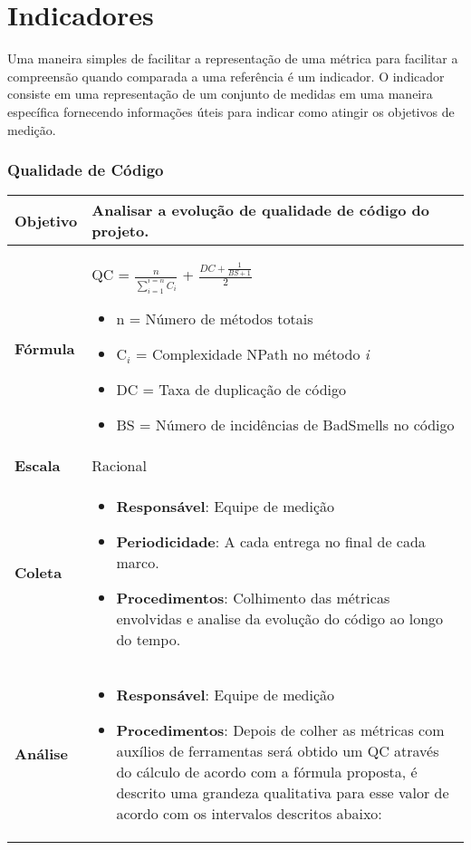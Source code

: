 \chapter{Indicadores}

Uma maneira simples de facilitar a representação de uma métrica para facilitar a compreensão quando comparada a uma referência é um indicador. O indicador consiste em uma representação de um conjunto de medidas em uma maneira específica fornecendo informações úteis para indicar como atingir os objetivos de medição.

\subsection{Qualidade de Código}

	\begin{tabular}{ |p{3cm}|p{12cm}| }
	 \hline
    \textbf{Objetivo} & Analisar a evolução de qualidade de código do projeto. \\
   \hline
    \textbf{Fórmula} & QC = $\frac{n}{\sum_{i=1}^{i=n} C_i}$ + $\frac{DC + \frac{1}{BS + 1}}{2}$ \begin{itemize}
			\item n = Número de métodos totais
			\item C$_i$ = Complexidade NPath no método \textit{i}
			\item DC = Taxa de duplicação de código
			\item BS = Número de incidências de BadSmells no código
		\end{itemize}\\
   \hline
    \textbf{Escala} & Racional \\
   \hline
    \textbf{Coleta} & \begin{itemize}
		 \item \textbf{Responsável}: Equipe de medição
     \item \textbf{Periodicidade}: A cada entrega no final de cada marco.
     \item \textbf{Procedimentos}: Colhimento das métricas envolvidas e analise da evolução do código ao longo do tempo.
    \end{itemize} \\
   \hline
    \textbf{Análise} & \begin{itemize} \item \textbf{Responsável}: Equipe de medição
    \item \textbf{Procedimentos}: Depois de colher as métricas com auxílios de ferramentas será obtido um QC através do cálculo de acordo com a fórmula proposta, é descrito uma grandeza qualitativa para esse valor de acordo com os intervalos descritos abaixo:

\end{itemize}
\end{tabular}
